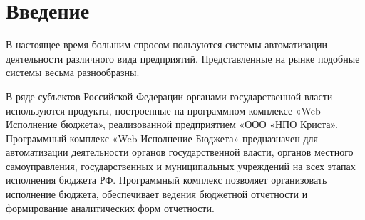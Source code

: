 \documentclass[a4paper]{extarticle}
\begin{document}
{\small \tableofcontents \par}

\newpage
\section*{Введение}
В настоящее время большим спросом пользуются системы автоматизации деятельности различного вида предприятий. Представленные на рынке подобные системы весьма разнообразны.\par
В ряде субъектов Российской Федерации органами государственной власти используются продукты, построенные на программном комплексе «Web-Исполнение бюджета», реализованной предприятием «ООО «НПО Криста». Программный комплекс «Web-Исполнение Бюджета» предназначен для автоматизации деятельности органов государственной власти, органов местного самоуправления, государственных и муниципальных учреждений на всех этапах исполнения бюджета РФ. Программный комплекс позволяет организовать исполнение бюджета, обеспечивает ведения бюджетной отчетности и формирование аналитических форм отчетности.\par
\end{document}
